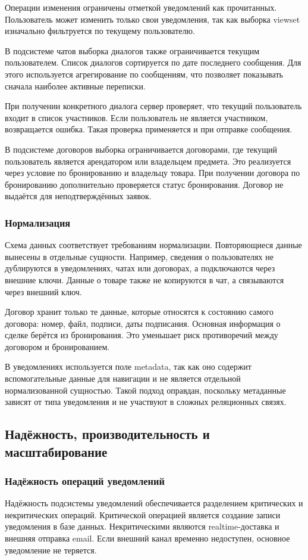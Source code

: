 Операции изменения ограничены отметкой уведомлений как прочитанных. Пользователь может изменить только свои уведомления, так как выборка viewset изначально фильтруется по текущему пользователю.

В подсистеме чатов выборка диалогов также ограничивается текущим пользователем. Список диалогов сортируется по дате последнего сообщения. Для этого используется агрегирование по сообщениям, что позволяет показывать сначала наиболее активные переписки.

При получении конкретного диалога сервер проверяет, что текущий пользователь входит в список участников. Если пользователь не является участником, возвращается ошибка. Такая проверка применяется и при отправке сообщения.

В подсистеме договоров выборка ограничивается договорами, где текущий пользователь является арендатором или владельцем предмета. Это реализуется через условие по бронированию и владельцу товара. При получении договора по бронированию дополнительно проверяется статус бронирования. Договор не выдаётся для неподтверждённых заявок.

\subsubsection{Нормализация}
Схема данных соответствует требованиям нормализации. Повторяющиеся данные вынесены в отдельные сущности. Например, сведения о пользователях не дублируются в уведомлениях, чатах или договорах, а подключаются через внешние ключи. Данные о товаре также не копируются в чат, а связываются через внешний ключ.

Договор хранит только те данные, которые относятся к состоянию самого договора: номер, файл, подписи, даты подписания. Основная информация о сделке берётся из бронирования. Это уменьшает риск противоречий между договором и бронированием.

В уведомлениях используется поле metadata, так как оно содержит вспомогательные данные для навигации и не является отдельной нормализованной сущностью. Такой подход оправдан, поскольку метаданные зависят от типа уведомления и не участвуют в сложных реляционных связях.

\subsection{Надёжность, производительность и масштабирование}

\subsubsection{Надёжность операций уведомлений}
Надёжность подсистемы уведомлений обеспечивается разделением критических и некритических операций. Критической операцией является создание записи уведомления в базе данных. Некритическими являются realtime-доставка и внешняя отправка email. Если внешний канал временно недоступен, основное уведомление не теряется.

